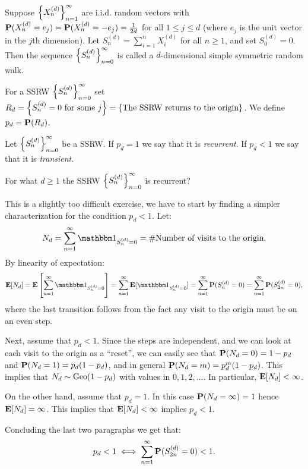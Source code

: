 \documentclass[11pt,a4paper]{article}
\begin{document}
\begin{definition}
  Suppose $\left\{X^{(d)}_n\right\}_{n=1}^{\infty}$
  are i.i.d. random vectors
  with $\mathbf{P}(X^{(d)}_n = e_j) = \mathbf{P}(X^{(d)}_n = -e_j) = \frac{1}{2d}$
  for all $1 \le j \le d$ (where $e_j$ is the unit vector in the $j$th
  dimension).
  Let $S^{(d)}_n = \sum_{i = 1}^{n} X^{(d)}_i$ for all $n \geq 1$,
  and set $S^{(d)}_0 = 0$.
  Then the sequence $\left\{S^{(d)}_n\right\}_{n=0}^{\infty}$ is called a $d$-dimensional
  simple symmetric random walk.
\end{definition}

\begin{definition}[Recurrence]
  For a SSRW $\left\{S^{(d)}_n\right\}_{n=0}^{\infty}$
  set $R_d = \left\{S^{(d)}_n = 0 \text{ for some } j\right\} = \left\{\text{The SSRW
  returns to the origin}\right\}$.
  We define $p_d = \mathbf{P}(R_d)$.
\end{definition}

\begin{definition}
  Let $\left\{S^{(d)}_n\right\}_{n=0}^{\infty}$ be a SSRW.
  If $p_d = 1$ we say that it is \textit{recurrent}.
  If $p_d < 1$ we say that it is \textit{transient}.
\end{definition}

\begin{exercise}
  \label{q:recurrent}
  For what $d \geq 1$ the SSRW $\left\{S^{(d)}_n\right\}_{n=0}^{\infty}$
  is recurrent?
\end{exercise}
\begin{solution}
  This is a slightly too difficult exercise, we have to start
  by finding a simpler characterization for the condition $p_d < 1$.
  Let:
  \[
    N_d =
    \sum_{n=1}^{\infty} \ind_{S^{(d)}_n = 0} =
    \#\text{Number of visits to the origin}.
  \]
  By linearity of expectation:
  \[
    \E[N_d] =
    \E\left[\sum_{n=1}^{\infty} \ind_{S^{(d)}_n = 0}\right] =
    \sum_{n=1}^{\infty} \E[\ind_{S^{(d)}_n = 0}] =
    \sum_{n=1}^{\infty} \Prob(S^{(d)}_n = 0) =
    \sum_{n=1}^{\infty} \Prob(S^{(d)}_{2n} = 0),
  \]
  where the last transition follows from the fact any visit to the origin
  must be on an even step.

  Next, assume that $p_d < 1$.
  Since the steps are independent,
  and we can look at each visit to the origin as a ``reset'',
  we can easily see that $\mathbf{P}(N_d = 0) = 1 - p_d$
  and $\mathbf{P}(N_d = 1) = p_d(1 - p_d)$,
  and in general $\mathbf{P}(N_d = m) = p_d^m (1 - p_d)$.
  This implies that $N_d \sim \operatorname{Geo}(1 - p_d)$ with values in $0,1,2,\dots$.
  In particular, $\mathbf{E}[N_d] < \infty$.

  On the other hand, assume that $p_d = 1$.
  In this case $\mathbf{P}(N_d = \infty) = 1$ hence $\mathbf{E}[N_d] = \infty$.
  This implies that $\mathbf{E}[N_d] < \infty$ implies $p_d < 1$.

  Concluding the last two paragraphs we get that:
  \[
    p_d < 1 \iff
    \sum_{n=1}^{\infty} \mathbf{P}(S^{(d)}_{2n} = 0) < 1.
  \]
\end{solution}
\end{document}
